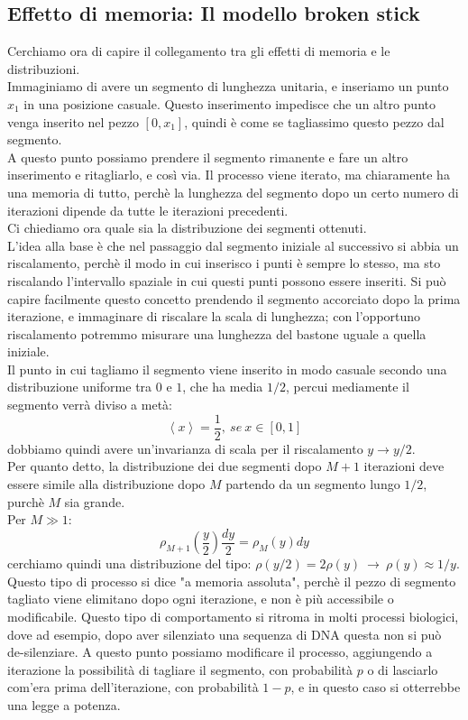 \documentclass[12pt]{article}
\newcommand{\lang}{\left\langle}
\newcommand{\rang}{\right\rangle}
\begin{document}
\subsection{Effetto di memoria: Il modello broken stick}
Cerchiamo ora di capire il collegamento tra gli effetti di memoria e le distribuzioni. \\
Immaginiamo di avere un segmento di lunghezza unitaria, e inseriamo un punto $x_1$ in una posizione casuale. Questo inserimento impedisce che un altro punto venga inserito nel pezzo $[0,x_1]$, quindi è come se tagliassimo questo pezzo dal segmento.  \\
A questo punto possiamo prendere il segmento rimanente e fare un altro inserimento e ritagliarlo, e così via. Il processo viene iterato, ma chiaramente ha una memoria di tutto, perchè la lunghezza del segmento dopo un certo numero di iterazioni dipende da tutte le iterazioni precedenti. \\
Ci chiediamo ora quale sia la distribuzione dei segmenti ottenuti. \\
L'idea alla base è che nel passaggio dal segmento iniziale al successivo si abbia un riscalamento, perchè il modo in cui inserisco i punti è sempre lo stesso, ma sto riscalando l'intervallo spaziale in cui questi punti possono essere inseriti. Si può capire facilmente questo concetto prendendo il segmento accorciato dopo la prima iterazione, e immaginare di riscalare la scala di lunghezza; con l'opportuno riscalamento potremmo misurare una lunghezza del bastone uguale a quella iniziale. \\
Il punto in cui tagliamo il segmento viene inserito in modo casuale secondo una distribuzione uniforme tra $0$ e $1$, che ha media $1/2$, percui mediamente il segmento verrà diviso a metà:
$$
	\lang x \rang = \frac{1}{2}, \ se \ x \in [0,1]
$$
dobbiamo quindi avere un'invarianza di scala per il riscalamento $y \rightarrow y/2. $\\
Per quanto detto, la distribuzione dei due segmenti dopo $M+1$ iterazioni deve essere simile alla distribuzione dopo $M$ partendo da un segmento lungo $1/2$, purchè $M$ sia grande. \\
Per $M \gg 1$:
$$
	\rho_{M+1}\left(\frac{y}{2}\right)\frac{dy}{2} = \rho_{M}(y)dy
$$
cerchiamo quindi una distribuzione del tipo: $\rho(y/2) = 2 \rho(y) \ \longrightarrow \ \rho(y)\approx 1/y$. \\
Questo tipo di processo si dice "a memoria assoluta", perchè il pezzo di segmento tagliato viene elimitano dopo ogni iterazione, e non è più accessibile o modificabile. Questo tipo di comportamento si ritroma in molti processi biologici, dove ad esempio, dopo aver silenziato una sequenza di DNA questa non si può de-silenziare.
A questo punto possiamo modificare il processo, aggiungendo a iterazione la possibilità di tagliare il segmento, con probabilità $p$ o di lasciarlo com'era prima dell'iterazione, con probabilità $1-p$, e in questo caso si otterrebbe una legge a potenza.
\end{document}
